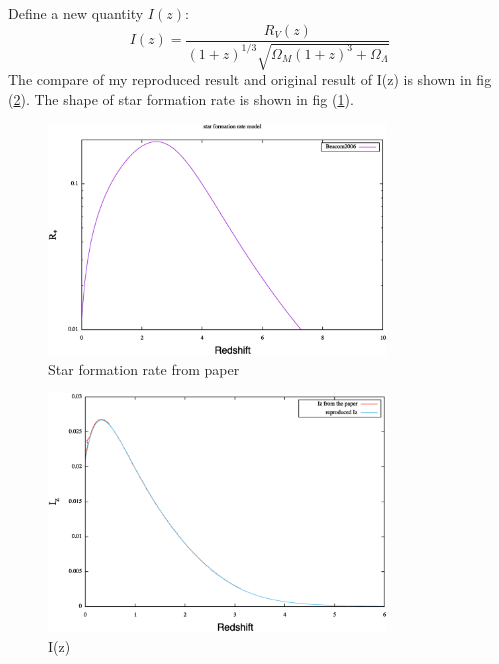 \documentclass[11pt, a4paper]{article}
\begin{document}
Define a new quantity $I(z)$:
\begin{equation}
I(z)=\frac{R_V(z)}{(1+z)^{1/3}\sqrt {\Omega_M(1+z)^3+\Omega_\Lambda}}
\end{equation}
The compare of my reproduced result and original result of I(z) is shown in fig (\ref{fig:Iz}). The shape of star formation rate is shown in fig (\ref{fig:sfr}).
\begin{figure}[htbp]
  \centering
  \includegraphics[width=0.8\textwidth]{SFR.eps}
  \caption{Star formation rate from paper\cite{Hopkins2006}}\label{fig:sfr} 
\end{figure}
\begin{figure}[htbp]
  \centering
  \includegraphics[width=0.8\textwidth]{Iz.eps}
  \caption{I(z)}\label{fig:Iz} 
\end{figure}
\end{document}
